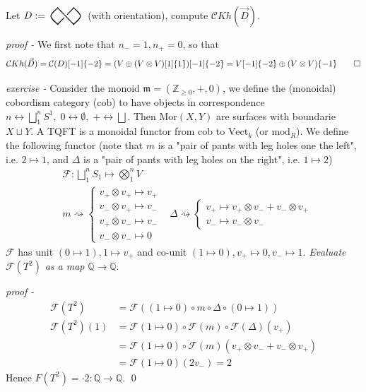 \documentclass[11pt]{article}
\theoremstyle{definition}
\newcommand{\set}[1]{\{#1\}}
\newcommand{\mor}{\text{Mor}}
\newcommand{\KP}[1]{%
  \begin{tikzpicture}[baseline=-\dimexpr\fontdimen22\textfont2\relax]
  #1
  \end{tikzpicture}%
}
\newcommand{\KPB}{%
  \KP{
    \draw[color=black,thick] (-0.3,0.3) -- (0.3,-0.3);
    \draw[color=black,thick] (-0.3,-0.3) -- (-0.05,-0.05);
    \draw[color=black,thick] (0.05,0.05) -- (0.3,0.3);
  }%
}
\newcommand{\KPR}{
    \KP{%
    \draw[color=black,thick] (-0.3,-0.3) .. controls (0.05,0) .. (-0.3,0.3);
  }%
}
\newcommand{\KPL}{
    \KP{%
    \draw[color=black,thick] (0.3,-0.3) .. controls (-0.05,0) .. (0.3,0.3);
  }%
}
\begin{document}
    Let \(D := \KPL\!\KPB\!\KPR\) (with orientation), compute \(\mathcal{C}Kh(\vec{D})\).

    \emph{proof - } We first note that \(n_- = 1, n_+ = 0\), so that \[\mathcal{C}Kh(\vec{D}) = \mathcal{C}(D)[-1]\set{-2} = (V \oplus (V\otimes V)[1]\set{1})[-1]\set{-2} = V[-1]\set{-2} \oplus (V\otimes V)\set{-1} \qed\]

    
    \emph{exercise - } Consider the monoid \(\mathfrak{m} = (\mathbb{Z}_{\geq 0},+,0)\), we define the (monoidal) cobordism category (cob) to have objects in correspondence
    \(n \longleftrightarrow \bigsqcup_1^n S^1, \; 0 \longleftrightarrow \emptyset, \; + \longleftrightarrow \bigsqcup\). Then \(\mor(X,Y)\) are surfaces with boundarie \(X \sqcup Y\). A TQFT is a monoidal functor from cob to \(\text{Vect}_k\) (or \(\text{mod}_R\)). We define the following functor (note that \(m\) is a "pair of pants with leg holes one the left", i.e. \(2 \mapsto 1\), and \(\Delta\) is a "pair of pants with leg holes on the right", i.e. \(1\mapsto 2\))
    \begin{align*}
        &\mathcal{F}: \bigsqcup_1^n S_1 \mapsto \bigotimes_1^n V \\
        &m \rightsquigarrow \begin{cases}
            v_+\otimes v_+ \mapsto v_+ \\
            v_-\otimes v_+ \mapsto v_- \\
            v_+\otimes v_- \mapsto v_- \\
            v_-\otimes v_- \mapsto 0 
        \end{cases}
        &\Delta \rightsquigarrow \begin{cases}
            v_+ \mapsto v_+\otimes v_- + v_- \otimes v_+ \\
            v_- \mapsto v_- \otimes v_-
        \end{cases}
    \end{align*}
    \(\mathcal{F}\) has unit \((0 \mapsto 1), 1 \mapsto v_+\) and co-unit \((1 \mapsto 0), v_+ \mapsto 0, v_- \mapsto 1\). \emph{Evaluate} \(\mathcal{F}(T^2)\) \emph{as a map} \(\mathbb{Q} \to \mathbb{Q}\).

    \emph{proof - }
    \begin{align*}
        \mathcal{F}(T^2) &= \mathcal{F}((1\mapsto 0) \circ m \circ \Delta \circ (0 \mapsto 1)) \\
        \mathcal{F}(T^2)(1) &= \mathcal{F}(1\mapsto 0) \circ \mathcal{F}(m) \circ \mathcal{F}(\Delta)(v_+) \\
        &= \mathcal{F}(1\mapsto 0) \circ \mathcal{F}(m)(v_+\otimes v_- + v_- \otimes v_+)\\
        &= \mathcal{F}(1\mapsto 0)(2v_-) = 2
    \end{align*}
    Hence \(F(T^2) = \cdot2: \mathbb{Q} \to \mathbb{Q}\). \qed
\end{document}
